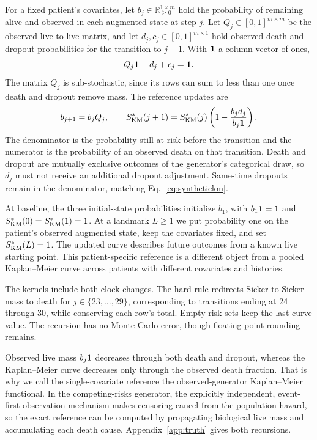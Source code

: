 For a fixed patient's covariates, let $b_j\in\mathbb R_{\ge0}^{1\times m}$ hold the probability of remaining alive and observed in each augmented state at step $j$. Let $Q_j\in[0,1]^{m\times m}$ be the observed live-to-live matrix, and let $d_j,c_j\in[0,1]^{m\times1}$ hold observed-death and dropout probabilities for the transition to $j+1$. With $\mathbf 1$ a column vector of ones,
\begin{equation}\label{eq:massbalance}
Q_j\mathbf 1+d_j+c_j=\mathbf 1.
\end{equation}
The matrix $Q_j$ is sub-stochastic, since its rows can sum to less than one once death and dropout remove mass. The reference updates are
\begin{equation}\label{eq:kmreference}
b_{j+1}=b_jQ_j,\qquad S^*_{\rm KM}(j+1)=S^*_{\rm KM}(j)\left(1-\frac{b_jd_j}{b_j\mathbf 1}\right).
\end{equation}
The denominator is the probability still at risk before the transition and the numerator is the probability of an observed death on that transition. Death and dropout are mutually exclusive outcomes of the generator's categorical draw, so $d_j$ must not receive an additional dropout adjustment. Same-time dropouts remain in the denominator, matching Eq.~\eqref{eq:synthetickm}.

At baseline, the three initial-state probabilities initialize $b_1$, with $b_1\mathbf 1=1$ and $S^*_{\rm KM}(0)=S^*_{\rm KM}(1)=1$. At a landmark $L\ge1$ we put probability one on the patient's observed augmented state, keep the covariates fixed, and set $S^*_{\rm KM}(L)=1$. The updated curve describes future outcomes from a known live starting point. This patient-specific reference is a different object from a pooled Kaplan--Meier curve across patients with different covariates and histories.

The kernels include both clock changes. The hard rule redirects Sicker-to-Sicker mass to death for $j\in\{23,\ldots,29\}$, corresponding to transitions ending at 24 through 30, while conserving each row's total. Empty risk sets keep the last curve value. The recursion has no Monte Carlo error, though floating-point rounding remains.

Observed live mass $b_j\mathbf 1$ decreases through both death and dropout, whereas the Kaplan--Meier curve decreases only through the observed death fraction. That is why we call the single-covariate reference the observed-generator Kaplan--Meier functional. In the competing-risks generator, the explicitly independent, event-first observation mechanism makes censoring cancel from the population hazard, so the exact reference can be computed by propagating biological live mass and accumulating each death cause. Appendix~\ref{app:truth} gives both recursions.


